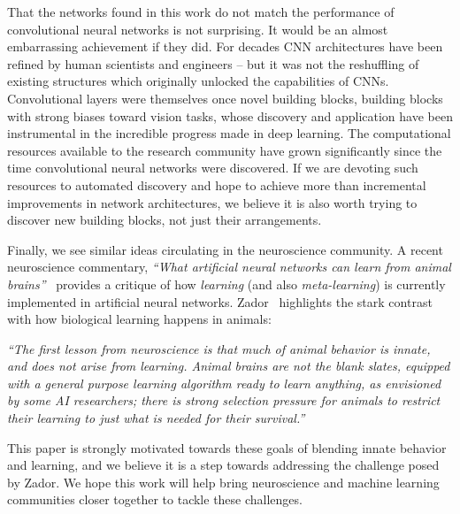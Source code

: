 That the networks found in this work do not match the performance of convolutional neural networks is not surprising. It would be an almost embarrassing achievement if they did. For decades CNN architectures have been refined by human scientists and engineers -- but it was not the reshuffling of existing structures which originally unlocked the capabilities of CNNs. Convolutional layers were themselves once novel building blocks, building blocks with strong biases toward vision tasks, whose discovery and application have been instrumental in the incredible progress made in deep learning.
%
The computational resources available to the research community have grown significantly since the time convolutional neural networks were discovered. If we are devoting such resources to automated discovery and hope to achieve more than incremental improvements in network architectures, we believe it is also worth trying to discover new building blocks, not just their arrangements.

Finally, we see similar ideas circulating in the neuroscience community. A recent neuroscience commentary, \textit{“What artificial neural networks can learn from animal brains”}~\cite{zador2019critique} provides a critique of how \textit{learning} (and also \textit{meta-learning}) is currently implemented in artificial neural networks. Zador~\cite{zador2019critique} highlights the stark contrast with how biological learning happens in animals:

\textit{“The first lesson from neuroscience is that much of animal behavior is innate, and does not arise from learning. Animal brains are not the blank slates, equipped with a general purpose learning algorithm ready to learn anything, as envisioned by some AI researchers; there is strong selection pressure for animals to restrict their learning to just what is needed for their survival.”} \cite{zador2019critique}

This paper is strongly motivated towards these goals of blending innate behavior and learning, and we believe it is a step towards addressing the challenge posed by Zador. We hope this work will help bring neuroscience and machine learning communities closer together to tackle these challenges.
